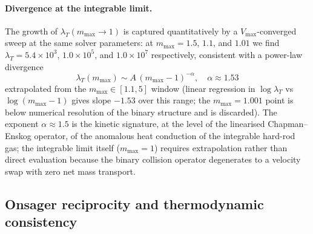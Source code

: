 \documentclass[aps,pre,twocolumn,superscriptaddress,longbibliography,floatfix]{revtex4-2}
\begin{document}
\paragraph*{Divergence at the integrable limit.}
The growth of $\lambda_T(m_{\max}\to 1)$ is captured
quantitatively by a $V_{\max}$-converged sweep at the same
solver parameters: at $m_{\max}=1.5$, $1.1$, and $1.01$ we
find $\lambda_T = 5.4\times 10^3$, $1.0\times 10^5$, and
$1.0\times 10^7$ respectively, consistent with a power-law
divergence
\begin{equation}
\lambda_T(m_{\max}) \sim
A\,(m_{\max}-1)^{-\alpha}, \quad \alpha \approx 1.53
\label{eq:lambdaT_scaling}
\end{equation}
extrapolated from the $m_{\max}\in[1.1,5]$ window (linear
regression in $\log\lambda_T$ vs $\log(m_{\max}-1)$ gives
slope $-1.53$ over this range; the $m_{\max}=1.001$ point
is below numerical resolution of the binary structure and is
discarded). The exponent $\alpha\approx 1.5$ is the kinetic
signature, at the level of the linearised
Chapman--Enskog operator, of the anomalous heat conduction of
the integrable hard-rod gas; the integrable limit itself
($m_{\max}=1$) requires extrapolation rather than direct
evaluation because the binary collision operator degenerates
to a velocity swap with zero net mass transport.

\subsection{Onsager reciprocity and thermodynamic consistency}
\end{document}
